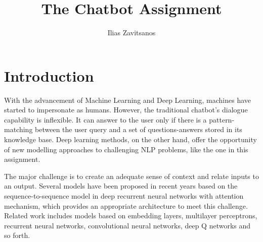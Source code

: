 \documentclass[10pt, twocolumn, a4paper]{article}
\begin{document}
\title{The Chatbot Assignment}
\author{Ilias Zavitsanos}
 
\maketitle 


\section{Introduction}
With the advancement of Machine Learning and Deep Learning, machines have started to impersonate as humans. However, the traditional chatbot’s dialogue capability is inflexible. It can answer to the user only if there is a pattern-matching between the user query and a set of questions-answers stored in its knowledge base. Deep learning methods, on the other hand, offer the opportunity of new modelling approaches to challenging NLP problems, like the one in this assignment.

The major challenge is to create an adequate sense of context and relate inputs to an output. Several models have been proposed in recent years based on the sequence-to-sequence model in deep recurrent neural networks with attention mechanism, which provides an appropriate architecture to meet this challenge. Related work includes models based on embedding layers, multilayer perceptrons, recurrent neural networks, convolutional neural networks, deep Q networks and so forth.
\end{document}
